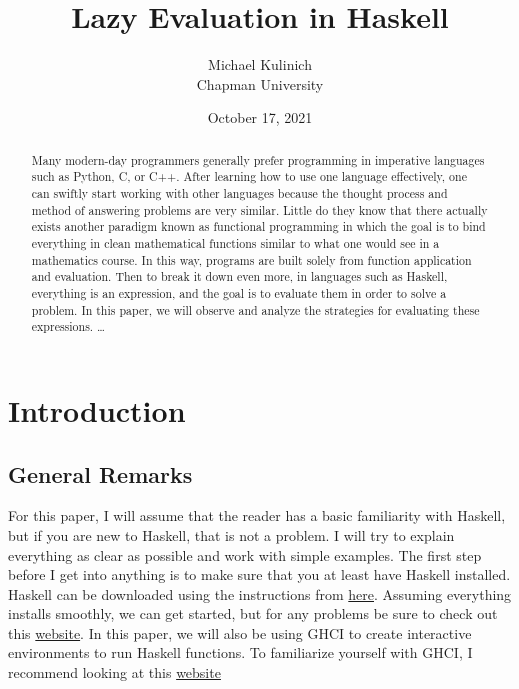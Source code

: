 \documentclass{article}
\title{Lazy Evaluation in Haskell}
\author{Michael Kulinich  \\ Chapman University}
\date{October 17, 2021}
\begin{document}
\maketitle

\begin{abstract}
Many modern-day programmers generally prefer programming in imperative languages such as Python, C, or C++. After learning how to use one language effectively, one can swiftly start working with other languages because the thought process and method of answering problems are very similar. Little do they know that there actually exists another paradigm known as functional programming in which the goal is to bind everything in clean mathematical functions similar to what one would see in a mathematics course. In this way, programs are built solely from function application and evaluation. Then to break it down even more, in languages such as Haskell, everything is an expression, and the goal is to evaluate them in order to solve a problem. In this paper, we will observe and analyze the strategies for evaluating these expressions.
\ldots 
\end{abstract}

\tableofcontents

\section{Introduction}\label{intro}

\subsection{General Remarks}

For this paper, I will assume that the reader has a basic familiarity with Haskell, but if you are new to Haskell, that is not a problem. I will try to explain everything as clear as possible and work with simple examples. The first step before I get into anything is to make sure that you at least have Haskell installed. Haskell can be downloaded using the instructions from \href{https://hackmd.io/@alexhkurz/Hk86XnCzD}{here}. Assuming everything installs smoothly, we can get started, but for any problems be sure to check out this \href{https://www.haskell.org/platform/}{website}. In this paper, we will also be using GHCI to create interactive environments to run Haskell functions. To familiarize yourself with GHCI, I recommend looking at this \href{https://downloads.haskell.org/~ghc/9.0.1/docs/html/users_guide/ghci.html}{website}
\end{document}
